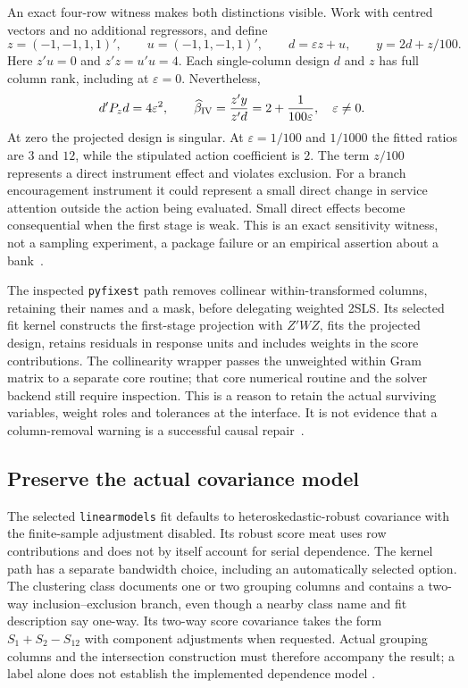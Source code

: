 An exact four-row witness makes both distinctions visible. Work with centred
vectors and no additional regressors, and define
\begin{equation}
 z=(-1,-1,1,1)',\qquad u=(-1,1,-1,1)',\qquad
 d=\varepsilon z+u,\qquad y=2d+z/100.
 \label{exec22:pyiv-witness}
\end{equation}
Here $z'u=0$ and $z'z=u'u=4$. Each single-column design $d$ and $z$ has full
column rank, including at $\varepsilon=0$. Nevertheless,
\begin{equation}
 d'P_zd=4\varepsilon^2,\qquad
 \widehat\beta_{\rm IV}=\frac{z'y}{z'd}
      =2+\frac{1}{100\varepsilon},\quad\varepsilon\ne0.
 \label{exec22:pyiv-ratio}
\end{equation}
At zero the projected design is singular. At $\varepsilon=1/100$ and $1/1000$
the fitted ratios are $3$ and $12$, while the stipulated action coefficient is
$2$. The term $z/100$ represents a direct instrument effect and violates
exclusion. For a branch encouragement instrument it could represent a small
direct change in service attention outside the action being evaluated.
Small direct effects become consequential when the first stage is weak.
This is an exact sensitivity witness, not a sampling experiment, a package
failure or an empirical assertion about a bank~\citep{exec22_pyiv_reference}.

The inspected \texttt{pyfixest} path removes collinear within-transformed
columns, retaining their names and a mask, before delegating weighted 2SLS.
Its selected fit kernel constructs the first-stage projection with $Z'WZ$,
fits the projected design, retains residuals in response units and includes
weights in the score contributions. The collinearity wrapper passes the
unweighted within Gram matrix to a separate core routine; that core numerical
routine and the solver backend still require inspection. This is a reason to
retain the actual surviving variables, weight roles and tolerances at the
interface. It is not evidence that a column-removal warning is a successful
causal repair~\citep{exec22_pyiv_kernels_pyfixest}.

\subsection{Preserve the actual covariance model}
\label{exec22:pyiv-covariance}

The selected \texttt{linearmodels} fit defaults to heteroskedastic-robust
covariance with the finite-sample adjustment disabled. Its robust score meat
uses row contributions and does not by itself account for serial dependence.
The kernel path has a separate bandwidth choice, including an automatically
selected option. The clustering class documents one or two grouping columns
and contains a two-way inclusion--exclusion branch, even though a nearby class
name and fit description say one-way. Its two-way score covariance takes the
form $S_1+S_2-S_{12}$ with component adjustments when requested. Actual grouping
columns and the intersection construction must therefore accompany the result;
a label alone does not establish the implemented dependence model
\citep{exec22_pyiv_kernels_linearmodels}.

